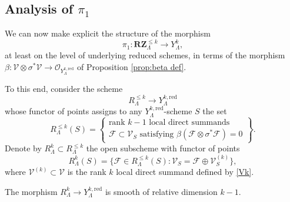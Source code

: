 \documentclass[11pt]{alggeom}
\newcommand{\red}{\mathrm{red}}
\newcommand{\co}{\mathcal O}
\begin{document}

\subsection{Analysis of $\pi_1$}



We can now make explicit the structure of the morphism
\[
 \pi_1 :  \mathbf{RZ}^{\le k}_\Lambda \to   Y^k_\Lambda ,
 \]
at least on the level of underlying reduced schemes, in terms of the morphism
$\beta : \mathscr{V} \otimes \sigma^*\mathscr{V} \to \co_{Y^{k,\red}_\Lambda}$ of Proposition \ref{prop:beta def}.
 
To this end, consider the  scheme
\[
R^{\le k}_\Lambda \to Y^{k,\red}_\Lambda
\]
 whose functor of points assigns to any $Y_\Lambda^{k,\red}$-scheme $S$ the set
\[
R^{\le k}_\Lambda(S) 
=
\left\{  
\begin{array}{c}  \mbox{rank $k-1$ local direct summands } \\  \mathscr{F} \subset \mathscr{V}_S  \mbox{ satisfying } \beta (\mathscr{F} \otimes \sigma^* \mathscr{F}) =0  \end{array}  \right\} .
\]
Denote by $R^k_\Lambda \subset R^{\le k}_\Lambda$ the open subscheme with functor of points 
\[
R^k_\Lambda(S) 
=
\{ 
\mathscr{F} \in R^{\le k}_\Lambda(S)  :  \mathscr{V}_S =  \mathscr{F} \oplus \mathscr{V}^{(k)}_S
\} ,
\]
where $\mathscr{V}^{(k)} \subset \mathscr{V}$ is the rank $k$ local direct summand defined by \eqref{Vk}.


\begin{proposition}\label{prop:Rstructure}
The morphism $R_\Lambda^k \to Y^{k,\red}_\Lambda$ is smooth of relative dimension $k-1$.
\end{proposition}
\end{document}
